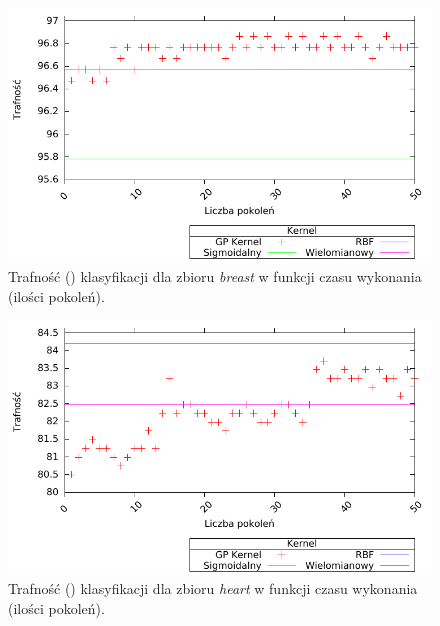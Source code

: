 	\begin{figure}
		\includegraphics[scale=0.90]{figures/results/accuracy/accuracy-breast}
		\caption{Trafność () klasyfikacji dla zbioru \emph{breast} w funkcji czasu wykonania (ilości pokoleń).\label{fig:acc-breast}}
	\end{figure}
	
	\begin{figure}
		\includegraphics[scale=0.90]{figures/results/accuracy/accuracy-heart}
		\caption{Trafność () klasyfikacji dla zbioru \emph{heart} w funkcji czasu wykonania (ilości pokoleń).\label{fig:acc-heart}}
	\end{figure}
	
